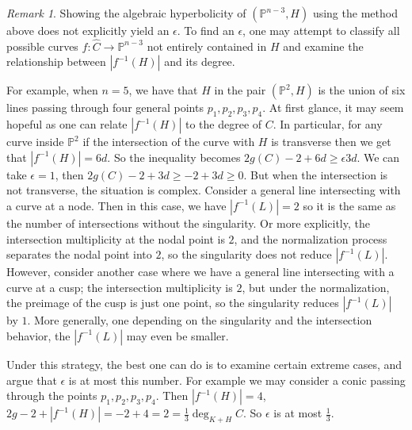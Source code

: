 \documentclass{amsart}
\theoremstyle{definition}
\theoremstyle{remark}
\newtheorem{remark}[theorem]{Remark}
\newcommand{\PP}{\mathbb{P}}
\begin{document}
\begin{remark}
Showing the algebraic hyperbolicity of $(\PP ^{n-3}, H)$ using the method above does not explicitly yield an $\epsilon$. To find an $\epsilon$, one may attempt to classify all possible curves $f:\widehat C\to \mathbb{P}^{n-3}$ not entirely contained in $H$ and examine the relationship between $|f^{-1}(H)|$ and its degree.

For example, when $n=5$, we have that $H$ in the pair $(\mathbb{P}^2, H)$ is the union of six lines passing through four general points $p_1, p_2, p_3, p_4$. At first glance, it may seem hopeful as one can relate $|f^{-1}(H)|$ to the degree of $C$. In particular, for any curve inside $\mathbb{P}^2$ if the intersection of the curve with $H$ is transverse then we get that $|f^{-1}(H)| = 6d$. So the inequality becomes $2g(C) - 2 + 6d \geq \epsilon 3d$. We can take $\epsilon =1$, then $2g(C)-2+3d \geq -2 +3d\geq 0$. But when the intersection is not transverse, the situation is complex. Consider a general line intersecting with a curve at a node. Then in this case, we have $|f^{-1}(L)| = 2$ so it is the same as the number of intersections without the singularity. Or more explicitly, the intersection multiplicity at the nodal point is $2$, and the normalization process separates the nodal point into $2$, so the singularity does not reduce $|f^{-1}(L)|$. However, consider another case where we have a general line intersecting with a curve at a cusp; the intersection multiplicity is $2$, but under the normalization, the preimage of the cusp is just one point, so the singularity reduces $|f^{-1}(L)|$ by $1$. More generally, one depending on the singularity and the intersection behavior, the $|f^{-1}(L)|$ may even be smaller.

Under this strategy, the best one can do is to examine certain extreme cases, and argue that $\epsilon$ is at most this number. For example we may consider a conic passing through the points $p_1, p_2, p_3, p_4$. Then $|f^{-1}(H)| = 4$, $2g-2+|f^{-1}(H)| = -2+4=2 = \frac 13\deg_{K+H} C$. So $\epsilon$ is at most $\frac 13$.
\end{remark}






\end{document}
